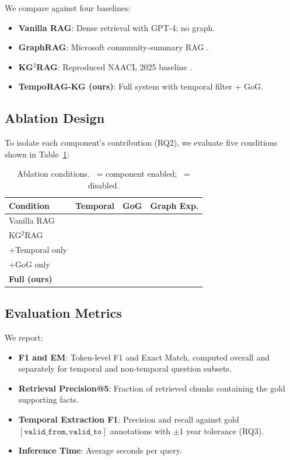 \documentclass[11pt]{article}
\newcommand{\cmark}{\ding{51}}
\newcommand{\xmark}{\ding{55}}
\begin{document}
We compare against four baselines:
\begin{itemize}
  \item \textbf{Vanilla RAG}: Dense retrieval with GPT-4; no graph.
  \item \textbf{GraphRAG}: Microsoft community-summary RAG \cite{edge2024graphrag}.
  \item \textbf{KG$^2$RAG}: Reproduced NAACL 2025 baseline \cite{zhu2025kg2rag}.
  \item \textbf{TempoRAG-KG (ours)}: Full system with temporal filter + GoG.
\end{itemize}

\subsection{Ablation Design}

To isolate each component's contribution (RQ2), we evaluate five conditions
shown in Table~\ref{tab:ablation}:

\begin{table}[t]
  \centering
  \small
  \begin{tabular}{lccc}
    \toprule
    \textbf{Condition} & \textbf{Temporal} & \textbf{GoG} & \textbf{Graph Exp.} \\
    \midrule
    Vanilla RAG            & \xmark & \xmark & \xmark \\
    KG$^2$RAG              & \xmark & \xmark & \cmark \\
    +Temporal only         & \cmark & \xmark & \cmark \\
    +GoG only              & \xmark & \cmark & \cmark \\
    \textbf{Full (ours)}   & \cmark & \cmark & \cmark \\
    \bottomrule
  \end{tabular}
  \caption{Ablation conditions. \cmark\ = component enabled;
  \xmark\ = disabled.}
  \label{tab:ablation}
\end{table}

\subsection{Evaluation Metrics}

We report:
\begin{itemize}
  \item \textbf{F1 and EM}: Token-level F1 and Exact Match, computed
    overall and separately for temporal and non-temporal question subsets.
  \item \textbf{Retrieval Precision@5}: Fraction of retrieved chunks
    containing the gold supporting facts.
  \item \textbf{Temporal Extraction F1}: Precision and recall against
    gold $[\mathtt{valid\_from}, \mathtt{valid\_to}]$ annotations
    with $\pm$1 year tolerance (RQ3).
  \item \textbf{Inference Time}: Average seconds per query.
\end{itemize}
\end{document}
